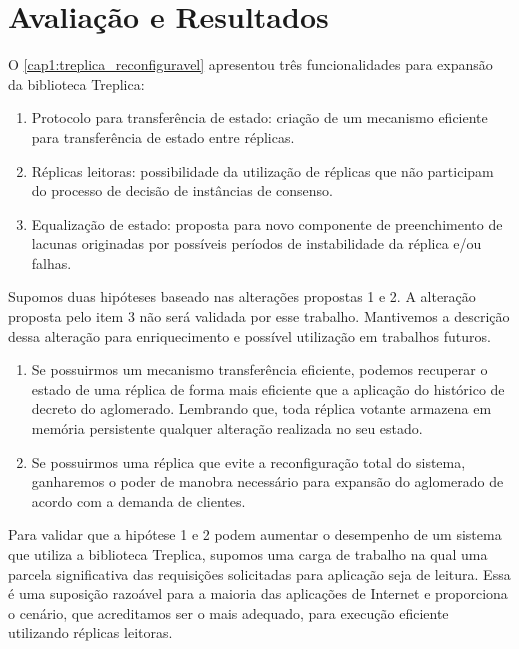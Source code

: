 \chapter{Avaliação e Resultados}\label{cap3}

O \autoref{cap1:treplica_reconfiguravel} apresentou três funcionalidades para expansão da
biblioteca Treplica:

\begin{enumerate}
  \item Protocolo para transferência de estado: criação de um mecanismo eficiente para
    transferência de estado entre réplicas.
  \item Réplicas leitoras: possibilidade da utilização de réplicas que não participam do
    processo de decisão de instâncias de consenso.
  \item Equalização de estado: proposta para novo componente de preenchimento de lacunas
    originadas por possíveis períodos de instabilidade da réplica e/ou falhas.
\end{enumerate}

Supomos duas hipóteses baseado nas alterações propostas 1 e 2. A alteração proposta pelo
item 3 não será validada por esse trabalho. Mantivemos a descrição dessa alteração para
enriquecimento e possível utilização em trabalhos futuros.

\begin{enumerate}
  \item Se possuirmos um mecanismo transferência eficiente, podemos recuperar o estado de
    uma réplica de forma mais eficiente que a aplicação do histórico de decreto do
    aglomerado. Lembrando que, toda réplica votante armazena em memória persistente
    qualquer alteração realizada no seu estado.
  \item Se possuirmos uma réplica que evite a reconfiguração total do sistema, ganharemos
    o poder de manobra necessário para expansão do aglomerado de acordo com a demanda de
    clientes.
\end{enumerate}

Para validar que a hipótese 1 e 2 podem aumentar o desempenho de um sistema que utiliza a
biblioteca Treplica, supomos uma carga de trabalho na qual uma parcela significativa das
requisições solicitadas para aplicação seja de leitura. Essa é uma suposição razoável para
a maioria das aplicações de Internet \cite{tpc02} e proporciona o cenário, que acreditamos
ser o mais adequado, para execução eficiente utilizando réplicas leitoras.

